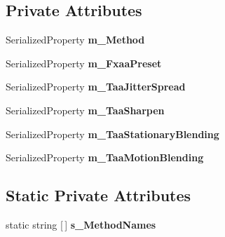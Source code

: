 \subsection*{Private Attributes}
\begin{DoxyCompactItemize}
\item 
\mbox{\label{class_unity_editor_1_1_post_processing_1_1_antialiasing_model_editor_a55a4b2d0327cc3b79ad73e427a8db3b1}} 
Serialized\+Property {\bfseries m\+\_\+\+Method}
\item 
\mbox{\label{class_unity_editor_1_1_post_processing_1_1_antialiasing_model_editor_a52b582bd494a6b0de560831f0b3a7dda}} 
Serialized\+Property {\bfseries m\+\_\+\+Fxaa\+Preset}
\item 
\mbox{\label{class_unity_editor_1_1_post_processing_1_1_antialiasing_model_editor_ac024e3995b0b6fcdc3d4be83c337ca92}} 
Serialized\+Property {\bfseries m\+\_\+\+Taa\+Jitter\+Spread}
\item 
\mbox{\label{class_unity_editor_1_1_post_processing_1_1_antialiasing_model_editor_affcfb6e04083d690c3cdb8b032a5cbb6}} 
Serialized\+Property {\bfseries m\+\_\+\+Taa\+Sharpen}
\item 
\mbox{\label{class_unity_editor_1_1_post_processing_1_1_antialiasing_model_editor_a02a64b539af11c6ef68f073d85c52922}} 
Serialized\+Property {\bfseries m\+\_\+\+Taa\+Stationary\+Blending}
\item 
\mbox{\label{class_unity_editor_1_1_post_processing_1_1_antialiasing_model_editor_a3a0f4731ec7e721d38711dad0caf0eb9}} 
Serialized\+Property {\bfseries m\+\_\+\+Taa\+Motion\+Blending}
\end{DoxyCompactItemize}
\subsection*{Static Private Attributes}
\begin{DoxyCompactItemize}
\item 
static string \mbox{[}$\,$\mbox{]} {\bfseries s\+\_\+\+Method\+Names}
\end{DoxyCompactItemize}
